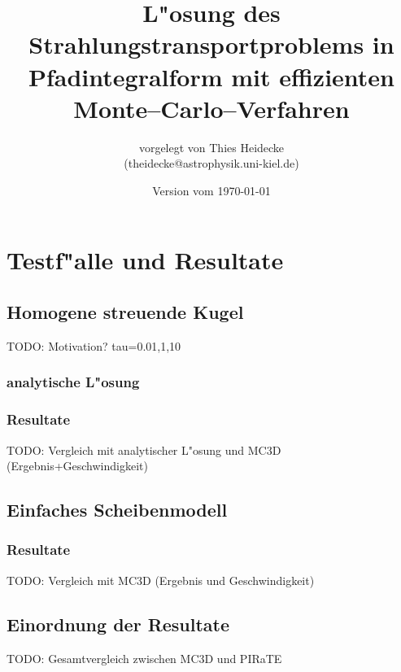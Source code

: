 \documentclass[11pt,a4paper,DIVcalc,BCOR8mm,titlepage,twoside]{scrartcl}
\begin{document}
	\titlehead{Christian--Albrechts--Universit"at zu Kiel\\ Institut f"ur Theoretische Physik und Astrophysik}
	\subject{Diplomarbeit}
	\title{L"osung des Strahlungstransportproblems in Pfadintegralform mit effizienten Monte--Carlo--Verfahren}
	\author{vorgelegt von Thies Heidecke\\(theidecke@astrophysik.uni-kiel.de)}
	\publishers{betreut durch Prof. Sebastian Wolf}
	\date{Version vom \today}
	\maketitle

	\tableofcontents
	\vfill
	\pagebreak
	
	\newcommand{\location}[1]{\mathbf{#1}}
	\newcommand{\scatter}[1]{\overset{#1}{\leftrightsquigarrow}}
	\newcommand{\normalized}[1]{\frac{#1}{||#1||}}
	
	
	
	
	
	
	
	\section{Testf"alle und Resultate}
	\subsection{Homogene streuende Kugel}
	TODO: Motivation? tau=0.01,1,10
	\subsubsection{analytische L"osung}
	\subsubsection{Resultate}
	TODO: Vergleich mit analytischer L"osung und MC3D (Ergebnis+Geschwindigkeit)
	\subsection{Einfaches Scheibenmodell}
	\subsubsection{Resultate}
	TODO: Vergleich mit MC3D (Ergebnis und Geschwindigkeit)
	\subsection{Einordnung der Resultate}
	TODO: Gesamtvergleich zwischen MC3D und PIRaTE
	
\end{document}
